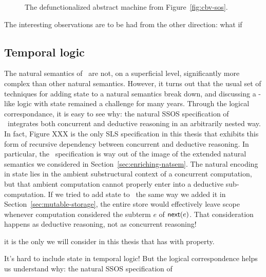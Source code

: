 \begin{figure}[t]
\caption{The defunctionalized abstract machine from Figure~\ref{fig:cbv-sos}.}
\label{fig:cbv-sos-defun}
\end{figure}

The interesting observations are to be had from the other direction: what if

\subsection{Temporal logic}

The natural semantics of \rowan~are not, on a superficial level,
significantly more complex than other natural semantics. However, it
turns out that the usual set of techniques for adding state to a
natural semantics break down, and discussing a \rowan-like logic with
state remained a challenge for many years. Through the
logical correspondance, it is easy to see why: the natural SSOS
specification of \rowan~integrates both concurrent and deductive
reasoning in an arbitrarily nested way. In fact, Figure XXX is the
only SLS specification in this thesis that exhibits this form of
recursive dependency between concurrent and deductive reasoning.  In
particular, the \rowan~specification is way out of the image of the
extended natural semantics we considered in
Section~\ref{sec:enriching-natsem}. The natural encoding in state lies
in the ambient substructural context of a concurrent computation, but
that ambient computation cannot properly enter into a deductive
sub-computation. If we tried to add state to \rowan~the same way we
added it in Section~\ref{sec:mutable-storage}, the entire store
would effectively leave scope whenever computation considered
the subterm $e$ of ${\sf next}(e)$. That consideration happens
as deductive reasoning, not as concurrent reasoning!

 it is the only we
will consider in this thesis that has with property.

It's hard to include state in temporal logic! But the logical correspondence
helps us understand why: the natural SSOS specification of 